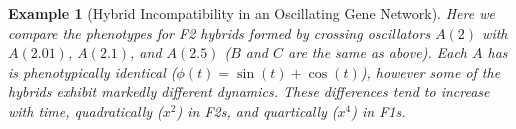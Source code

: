 \documentclass[9 pt]{article}
\newcommand{\1}{\mathbbm{1}}
\newtheorem{example}{Example}
\begin{document}
      \begin{example}[Hybrid Incompatibility in an Oscillating Gene Network]

        Here we compare the phenotypes for F2 hybrids formed by crossing oscillators $A(2)$ with $A(2.01)$, $A(2.1)$, and $A(2.5)$ ($B$ and $C$ are the same as above). Each $A$ has is phenotypically identical ($\phi(t) = \sin(t) + \cos(t)$), however some of the hybrids exhibit markedly different dynamics. These differences tend to increase with time, quadratically ($x^{2}$) in F2s, and quartically ($x^{4}$) in F1s. 



\end{example}
\end{document}

